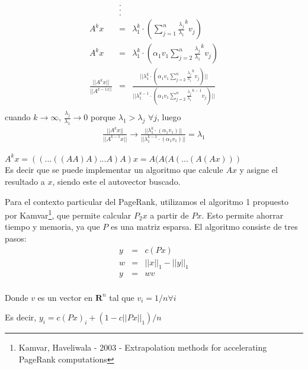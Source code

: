 \documentclass[a4paper]{article}
\begin{document}
\begin{eqnarray*}
&.&\\
&.&\\
&.&\\
A^kx&=&\lambda_1^k \cdot (\sum_{j=1}^{n} \frac {\lambda_j}{\lambda_1}^k v_j)\\
A^kx&=&\lambda_1^k \cdot (\alpha_1 v_1 \sum_{j=2}^{n} \frac {\lambda_j}{\lambda_1}^k v_j)\\
\frac{||A^kx||}{||A^{k-1x||}}&=&\frac{||\lambda_1^k \cdot (\alpha_1 v_1 \sum_{j=2}^{n} \frac {\lambda_j}{\lambda_1}^k v_j)||}{||\lambda_1^{k-1} \cdot (\alpha_1 v_1 \sum_{j=2}^{n} \frac {\lambda_j}{\lambda_1}^{k-1} v_j)||}\\
\end{eqnarray*}
cuando $k \rightarrow \infty$, $\frac{\lambda_j}{\lambda_1} \rightarrow 0$ porque $\lambda_1>\lambda_j$ $\forall j$, luego 
\begin{eqnarray*}
\frac{||A^kx||}{||A^{k-1}x||} \rightarrow \frac{||\lambda_1^k \cdot (\alpha_1 v_1) ||}{||\lambda_1^{k-1} \cdot (\alpha_1 v_1)||} = \lambda_1
\end{eqnarray*}

$A^kx=((...((AA)A)...A)A)x=A(A(A(...(A(Ax)))$\\
Es decir que se puede implementar un algoritmo que calcule $Ax$ y asigne el resultado a $x$, siendo este el autovector buscado.

Para el contexto particular del PageRank, utilizamos el algoritmo 1 propuesto por Kamvar\footnote{Kamvar, Haveliwala - 2003 - Extrapolation methods for accelerating PageRank computations}, que permite calcular $P_2 x$ a partir de $Px$. Esto permite ahorrar tiempo y memoria, ya que $P$ es una matriz esparsa. El algoritmo consiste de tres pasos:
\begin{eqnarray*}
y&=&c(Px)\\
w&=&||x||_1-||y||_1\\
y&=&wv\\
\end{eqnarray*}

Donde $v$ es un vector en $ \textbf{R}^n$ tal que $v_i=1/n \forall i$

Es decir, $y_i=c(Px)_i+(1-c||Px||_1)/n$ \\


\end{document}
